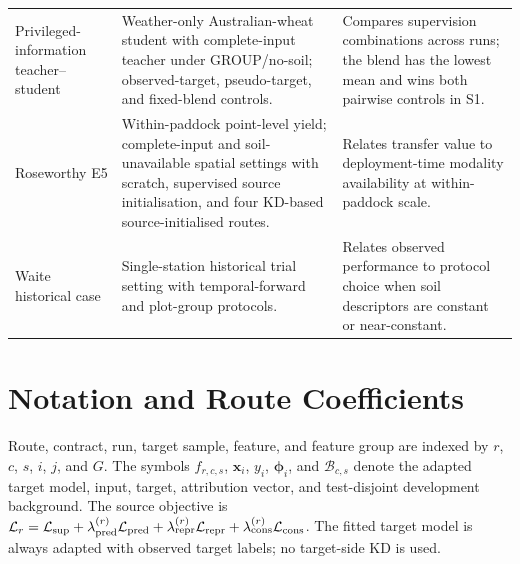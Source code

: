 \documentclass[runningheads]{venue/lncs/llncs}
\begin{document}
\begin{landscape}
\begin{longtable}{p{3.2cm}p{6.4cm}p{7.0cm}}
Privileged-information teacher--student & Weather-only Australian-wheat student with complete-input teacher under GROUP/no-soil; observed-target, pseudo-target, and fixed-blend controls. & Compares supervision combinations across runs; the blend has the lowest mean and wins both pairwise controls in S1.\\
Roseworthy E5 & Within-paddock point-level yield; complete-input and soil-unavailable spatial settings with scratch, supervised source initialisation, and four KD-based source-initialised routes. & Relates transfer value to deployment-time modality availability at within-paddock scale.\\
Waite historical case & Single-station historical trial setting with temporal-forward and plot-group protocols. & Relates observed performance to protocol choice when soil descriptors are constant or near-constant.\\
\bottomrule
\end{longtable}
\end{landscape}

\section{Notation and Route Coefficients}

Route, contract, run, target sample, feature, and feature group are indexed by $r$, $c$, $s$, $i$, $j$, and $G$. The symbols $f_{r,c,s}$, $\mathbf{x}_i$, $y_i$, $\boldsymbol{\phi}_i$, and $\mathcal{B}_{c,s}$ denote the adapted target model, input, target, attribution vector, and test-disjoint development background. The source objective is $\mathcal{L}_r=\mathcal{L}_{\rm sup}+\lambda_{\rm pred}^{(r)}\mathcal{L}_{\rm pred}+\lambda_{\rm repr}^{(r)}\mathcal{L}_{\rm repr}+\lambda_{\rm cons}^{(r)}\mathcal{L}_{\rm cons}$. The fitted target model is always adapted with observed target labels; no target-side KD is used.
\end{document}
